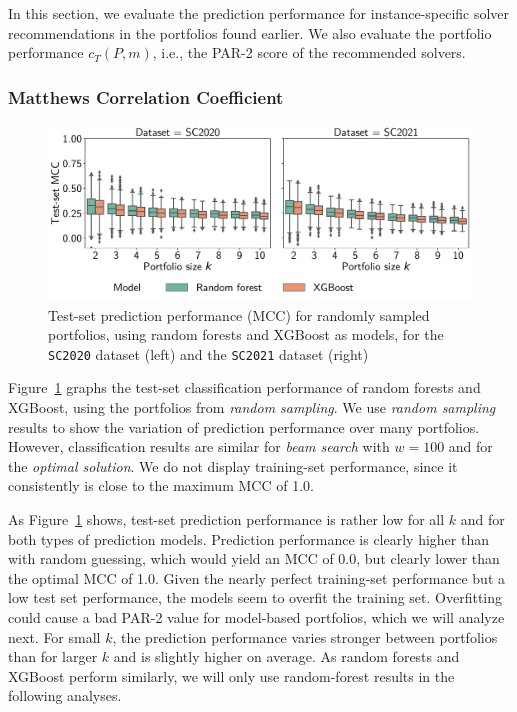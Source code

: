 \documentclass[a4paper,USenglish,pdfa]{lipics-v2021} %
\begin{document}
In this section, we evaluate the prediction performance for instance-specific solver recommendations in the portfolios found earlier. 
We also evaluate the portfolio performance $c_T(P,m)$, i.e., the PAR-2 score of the recommended solvers.

\subsubsection{Matthews Correlation Coefficient}

\begin{figure}[tb]
	\centering
	\includegraphics[width=\columnwidth]{plots/prediction-test-mcc.pdf}
	\caption{
		Test-set prediction performance (MCC) for randomly sampled portfolios, using random forests and XGBoost as models, for the \texttt{SC2020} dataset (left) and the \texttt{SC2021} dataset (right)
	}
	\label{fig:prediction-test-mcc}
\end{figure}

Figure~\ref{fig:prediction-test-mcc} graphs the test-set classification performance of random forests and XGBoost, using the portfolios from \emph{random sampling}.
We use \emph{random sampling} results to show the variation of prediction performance over many portfolios.
However, classification results are similar for \emph{beam search} with $w=100$ and for the \emph{optimal solution}.
We do not display training-set performance, since it consistently is close to the maximum MCC of 1.0.

As Figure~\ref{fig:prediction-test-mcc} shows, test-set prediction performance is rather low for all $k$ and for both types of prediction models.
Prediction performance is clearly higher than with random guessing, which would yield an MCC of 0.0, but clearly lower than the optimal MCC of 1.0.
Given the nearly perfect training-set performance but a low test set performance, the models seem to overfit the training set.
Overfitting could cause a bad \mbox{PAR-2} value for model-based portfolios, which we will analyze next.
For small $k$, the prediction performance varies stronger between portfolios than for larger $k$ and is slightly higher on average.
As random forests and XGBoost perform similarly, we will only use random-forest results in the following analyses.
\end{document}

